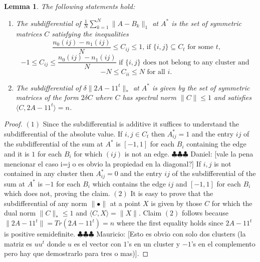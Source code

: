 \documentclass[12pt]{amsart}
\newtheorem{lemma}{Lemma}[section]
\theoremstyle{remark}
\DeclareMathOperator*{\argmin}{arg\,min}
\newcommand{\PP}{\mathbb{P}}
\newcommand{\ddr}[1]{{\color{blue} \sf $\clubsuit\clubsuit\clubsuit$ Daniel: [#1]}}
\newcommand{\mv}[1]{{\color{red} \sf $\clubsuit\clubsuit\clubsuit$ Mauricio: [#1]}}
\begin{document}
\begin{lemma} The following statements hold:
\label{lem: subdiff}
\begin{enumerate}
\item The subdifferential of $\frac{1}{N}\sum_{k=1}^N\|A-B_k\|_1$ at $A^*$ is the set of symmetric matrices $C$ satisfying the inequalities
\[ \frac{n_0(ij)-n_1(ij)}{N}\leq C_{ij}\leq 1 \text{, if $\{i,j\}\subseteq C_t$ for some $t$,}\]
\[-1\leq C_{ij} \leq \frac{n_0(ij)-n_1(ij)}{N} \text{ if $\{i,j\}$ does not belong to any cluster and } \]
\[-N \leq C_{ii} \leq N \text{ for all }i.\]

\item The subdifferential of $\delta\|2A-11^t\|_{*}$ at $A^*$ is given by the set of symmetric matrices of the form $2\delta C$ where $C$ has spectral norm $\|C\|\leq 1$ and satisfies $\langle C, 2A-11^t\rangle = n$.

\end{enumerate}

\end{lemma}
\begin{proof} $(1)$ Since the subdifferential is additive it suffices to understand the subdifferential of the absolute value. If $i,j\in C_t$ then $A^*_{ij}=1$ and the entry $ij$ of the subdifferential of the sum at $A^*$ is $[-1,1]$ for each $B_i$ containing the edge and it is $1$ for each $B_i$ for which $(ij)$ is not an edge. \ddr{vale la pena mencionar el caso i=j o es obvio la propiedad en la diagonal?} If $i,j$ is not contained in any cluster then $A^*_{ij}=0$ and the entry $ij$ of the subdifferential of the sum at $A^*$ is $-1$ for each $B_i$ which contains the edge $ij$ and $[-1,1]$ for each $B_i$ which does not, proving the claim. $(2)$ It is easy to prove that the subdifferential of any norm $\|\bullet\|$ at a point $X$ is given by those $C$ for which the dual norm $\|C\|_*\leq 1$ and $\langle C,X\rangle =\|X\|$. Claim $(2)$ follows because $\|2A-11^t\|=Tr(2A-11^t)=n$ where the first equality holds since $2A-11^t$ is positive semidefinite.\mv{Esto es obvio con solo dos clusters (la matriz es $uu^t$ donde $u$ es el vector con $1$'s en un cluster y $-1$'s en el complemento pero hay que demostrarlo para tres o mas)}.
\end{proof}

\end{document}
